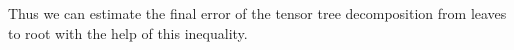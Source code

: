\documentclass[12pt]{article}
\begin{document}
Thus we can estimate the final error of the tensor tree decomposition from leaves to root with the help of this inequality.

%

 
\end{document}
